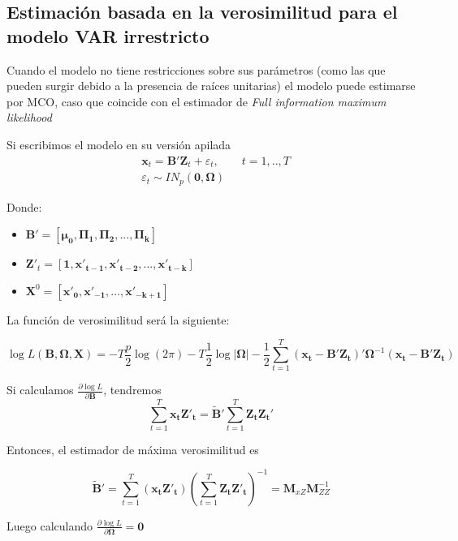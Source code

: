 \documentclass[12pt, twoside]{book}\usepackage[]{graphicx}\usepackage[]{color}
\numberwithin{equation}{section}
\numberwithin{theorem}{section}
\numberwithin{teorema}{section}
\numberwithin{defi}{section}
\numberwithin{prop}{section}
\numberwithin{defi}{section}
\theoremstyle{plain}
\begin{document}
\subsection{Estimación basada en la verosimilitud para el modelo VAR irrestricto}

Cuando el modelo no tiene restricciones sobre sus parámetros (como las que pueden surgir debido a la presencia de raíces unitarias) el modelo puede estimarse por MCO, caso que coincide con el estimador de \textit{Full information maximum likelihood}

Si escribimos el modelo en su versión apilada
\begin{align}
& \mathbf{x}_{t} = \mathbf{B'Z}_{t}+\varepsilon_{t}, \qquad t=1,..,T \\ 
& \varepsilon_{t}\sim IN_{p}(\mathbf{0,\Omega})
\end{align}

Donde: 
\begin{itemize}
\item $\mathbf{B'}=\left[\boldsymbol{\mu_{0}, \Pi_{1}, \Pi_{2},...,\Pi_{k}}\right]$
\item $\mathbf{Z'}_{t} = \left[\mathbf{1,x'_{t-1}, x'_{t-2},...,x'_{t-k}}\right]$
\item $\mathbf{X}^{0} = \left[\mathbf{x'_{0}, x'_{-1},...,x'_{-k+1}}\right]$ 
\end{itemize}

La función de verosimilitud será la siguiente: 

\begin{equation}
\log L(\boldsymbol{B,\Omega,X}) = -T\frac{p}{2}\log(2\pi)-T\frac{1}{2}\log|\mathbf{\Omega}|-\frac{1}{2}\sum_{t=1}^{T}(\mathbf{x_{t}-B'Z_{t}})'\boldsymbol{\Omega}^{-1}(\mathbf{x_{t}-B'Z_{t}})
\end{equation}

Si calculamos $\frac{\partial \log L}{\partial \mathbf{B}}$, tendremos
\begin{equation*}
\sum_{t=1}^{T}\mathbf{x_{t}Z'_{t}} = \mathbf{\tilde{B}'}\sum_{t=1}^{T}\mathbf{Z_{t}Z_{t}'}
\end{equation*}

Entonces, el estimador de máxima verosimilitud es 

\begin{equation}
\mathbf{\tilde{B}}' = \sum_{t=1}^{T}(\mathbf{x_{t}Z'_{t}})\left(\sum_{t=1}^{T}\mathbf{Z_{t}Z'_{t}}\right)^{-1} = \mathbf{M}_{xZ}\mathbf{M}_{ZZ}^{-1}
\end{equation}

Luego calculando $\frac{\partial \log L}{\partial \boldsymbol{\Omega}}=\mathbf{0}$
\end{document}
